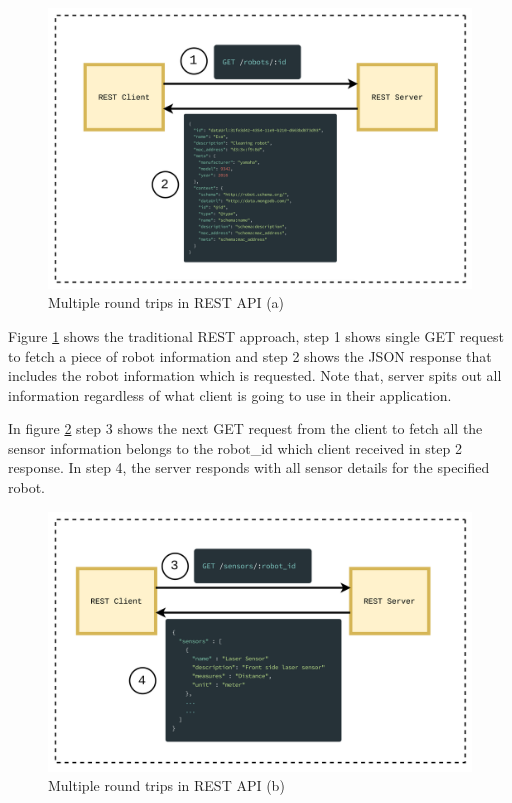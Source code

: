 	\begin{figure}[!htbp] 
		\begin{center}
			\includegraphics[trim={0 0 0 2cm},clip,scale=0.09]{./images/png/rest_roundtrip_1}	
			\caption{Multiple round trips in REST API (a)}	
			\label{fig:rest_roundtrip_1}	
		\end{center}
	\end{figure}
	
   Figure \ref{fig:rest_roundtrip_1} shows the traditional REST approach, step 1 shows single GET request to fetch a piece of robot information and step 2 shows the JSON response that includes the robot information which is requested. Note that, server spits out all information regardless of what client is going to use in their application. 
   
   In figure \ref{fig:rest_roundtrip_2} step 3 shows the next GET request from the client to fetch all the sensor information belongs to the robot\_id which client received in step 2 response. In step 4, the server responds with all sensor details for the specified robot. 
   
   \newpage
	
	\begin{figure}[!htbp] 
		\begin{center}
			\includegraphics[trim={0 0 0 2cm},clip,scale=0.09]{./images/png/rest_roundtrip_2}	
			\caption{Multiple round trips in REST API (b)}	
			\label{fig:rest_roundtrip_2}	
		\end{center}
	\end{figure}

